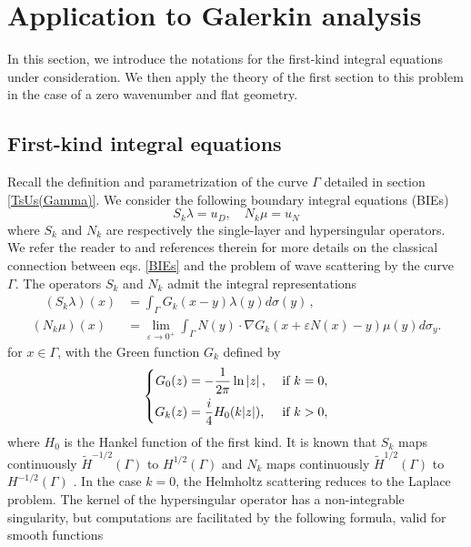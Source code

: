 \documentclass[a4paper]{article}
\begin{document}
\section{Application to Galerkin analysis}

In this section, we introduce the notations for the first-kind integral equations under consideration. We then apply the theory of the first section to this problem in the case of a zero wavenumber and flat geometry. 

\subsection{First-kind integral equations}

Recall the definition and parametrization of the curve $\Gamma$ detailed in section \ref{TsUs(Gamma)}. We consider the following boundary integral equations (BIEs)
\begin{equation}
	\label{BIEs}
	S_{k} \lambda = u_D, \quad N_k \mu = u_N
\end{equation}
where $S_k$ and $N_k$ are respectively the single-layer and hypersingular operators. We refer the reader to \cite{alouges2018new} and references therein for more details on the classical connection between eqs. \eqref{BIEs} and the problem of wave scattering by the curve $\Gamma$. The operators $S_k$ and $N_k$ admit the integral representations
\begin{equation}
\begin{split}
\quad (S_k \lambda)(x) &= \int_{\Gamma} G_k(x-y) \lambda(y) d\sigma(y)\,,\\ 
(N_k \mu) (x) &= \lim_{\varepsilon \to 0^+} \int_{\Gamma} N(y) \cdot \nabla G_k(x + \varepsilon N(x) - y) \mu(y) d\sigma_y.
\end{split}
\label{defNk}
\end{equation}
for $x \in \Gamma$, with the Green function $G_k$  defined by
\begin{equation}
\left\{
\begin{aligned}
G_0(z) &= -\dfrac{1}{2\pi} \ln \left\lvert z \right\rvert, && \text{ if } k= 0,\\
G_k(z) &= \frac{i}{4}H_0(k|z|), && \text{ if } k > 0,
\end{aligned} 
\right.
\end{equation} 
where $H_0$ is the Hankel function of the first kind. It is known that $S_k$ maps continuously $\tilde{H}^{-1/2}(\Gamma)$ to $H^{1/2}(\Gamma)$ \cite[Theorem 1.8]{wendland1990hypersingular} and $N_k$ maps continuously $\tilde{H}^{1/2}(\Gamma)$ to $H^{-1/2}(\Gamma)$ \cite[Theorem 1.4]{wendland1990hypersingular}. In the case $k=0$, the Helmholtz scattering reduces to the Laplace problem. The kernel of the hypersingular operator has a non-integrable singularity, but computations are facilitated by the following formula, valid for smooth functions 
\end{document}
